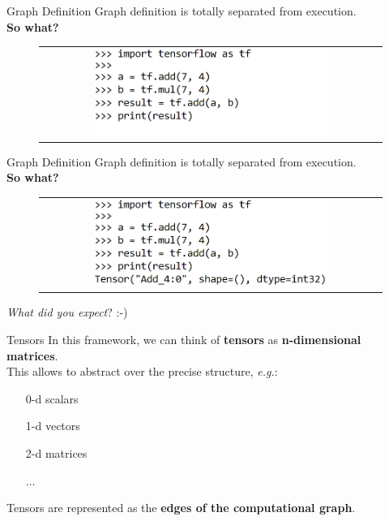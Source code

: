 \documentclass[aspectratio=169]{beamer}
\begin{document}
\begin{frame}{Graph Definition}
Graph definition is totally separated from execution.\\
\textbf{So what?}
\begin{figure}
\begin{tabular}{c}
	\includegraphics[width=0.7\textwidth]{img/tf/graph_definition_0.png}
\end{tabular}
\end{figure}
\end{frame}


\begin{frame}{Graph Definition}
Graph definition is totally separated from execution.\\
\textbf{So what?}
\begin{figure}
\begin{tabular}{c}
	\includegraphics[width=0.7\textwidth]{img/tf/graph_definition_1.png}
\end{tabular}
\end{figure}
\textit{What did you expect}? :-)
\end{frame}


\begin{frame}{Tensors}
In this framework, we can think of \textbf{tensors} as \textbf{n-dimensional matrices}.\\
\vspace{0.25cm}
This allows to abstract over the precise structure, \textit{e.g.}:
\begin{itemize}
\item[0-d] scalars
\item[1-d] vectors
\item[2-d] matrices
\item[] $\dots$
\end{itemize}
Tensors are represented as the \textbf{edges of the computational graph}.
\end{frame}
\end{document}
